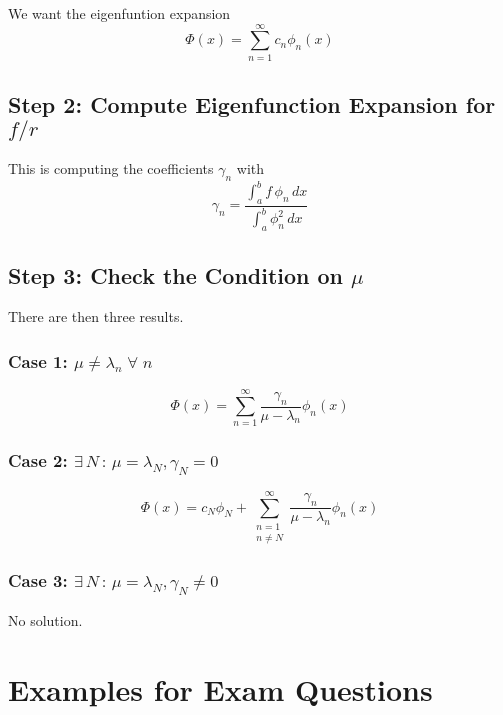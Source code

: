We want the eigenfuntion expansion
\begin{equation}\label{eq:eigenfunction-expansion-general}
    \Phi(x) = \sum_{n=1}^{\infty} c_n \phi_n(x)
\end{equation}

\subsection*{Step 2: Compute Eigenfunction Expansion for $f/r$}
This is computing the coefficients $\gamma_n$ with
\begin{equation}\label{eq:gamma-eigexpand}
    \gamma_n = \frac{\int_a^b{f\,\phi_n\,dx}}{\int_a^b{\phi^2_n\,dx}}
\end{equation}

\subsection*{Step 3: Check the Condition on $\mu$}
There are then three results.
\subsubsection{Case 1: $\mu\neq\lambda_n\;\forall\; n$}
\begin{equation}\label{eq:eigenfunction-expansion-noproblem}
    \Phi(x) = \sum_{n=1}^{\infty} \frac{\gamma_n}{\mu-\lambda_n} \phi_n(x)
\end{equation}
\subsubsection{Case 2: $\exists\, N\, :\, \mu=\lambda_N, \gamma_N=0$}
\begin{equation}\label{eq:eigenfunction-expansion-noproblem}
    \Phi(x) = c_N\phi_N + \sum_{\substack{n=1 \\ n\neq N}}^{\infty} \frac{\gamma_n}{\mu-\lambda_n} \phi_n(x)
\end{equation}
\subsubsection{Case 3: $\exists\, N\, :\, \mu=\lambda_N, \gamma_N \neq 0$}
\begin{center}
    No solution.
\end{center}

\section{Examples for Exam Questions}


